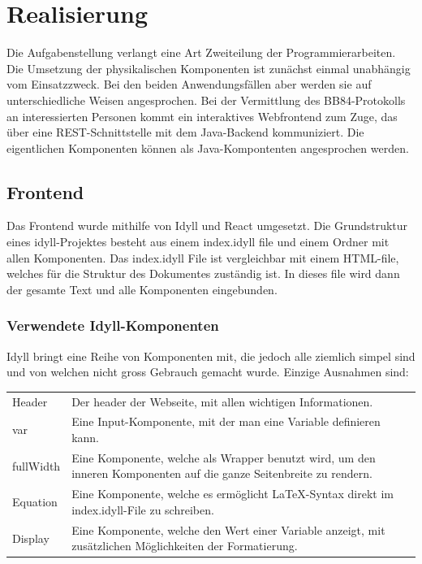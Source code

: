 \documentclass[a4paper,10.2pt,pdftex]{scrartcl}%
\begin{document}
\section{Realisierung}
Die Aufgabenstellung verlangt eine Art Zweiteilung der Programmierarbeiten. Die Umsetzung der physikalischen Komponenten ist zunächst einmal unabhängig vom Einsatzzweck. Bei den beiden Anwendungsfällen aber werden sie auf unterschiedliche Weisen angesprochen. Bei der Vermittlung des BB84-Protokolls an interessierten Personen kommt ein interaktives Webfrontend zum Zuge, das über eine REST-Schnittstelle mit dem Java-Backend kommuniziert. Die eigentlichen Komponenten können als Java-Kompontenten angesprochen werden. 


\subsection{Frontend}
Das Frontend wurde mithilfe von Idyll und React umgesetzt. Die Grundstruktur eines idyll-Projektes besteht aus einem index.idyll file und einem Ordner mit allen Komponenten. Das index.idyll File ist vergleichbar mit einem HTML-file, welches für die Struktur des Dokumentes zuständig ist. In dieses file wird dann der gesamte Text und alle Komponenten eingebunden.
\subsubsection{Verwendete Idyll-Komponenten}
Idyll bringt eine Reihe von Komponenten mit, die jedoch alle ziemlich simpel sind und von welchen nicht gross Gebrauch gemacht wurde. Einzige Ausnahmen sind:

\begin{tabularx}{\textwidth}{p{2.5cm}p{8.5cm}}
Header & Der header der Webseite, mit allen wichtigen Informationen.\\
var & Eine Input-Komponente, mit der man eine Variable definieren kann. \\
fullWidth & Eine Komponente, welche als Wrapper benutzt wird, um den inneren Komponenten auf die ganze Seitenbreite zu rendern. \\
Equation & Eine Komponente, welche es ermöglicht LaTeX-Syntax direkt im index.idyll-File zu schreiben. \\
Display & Eine Komponente, welche den Wert einer Variable anzeigt, mit zusätzlichen Möglichkeiten der Formatierung.
\end{tabularx}
\end{document}
